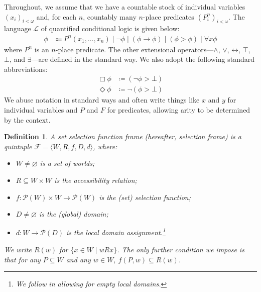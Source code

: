 \documentclass[12pt]{article}
\newtheorem{definition}{Definition}
\newcommand{\tup}[1]{\langle #1 \rangle}
\newcommand{\would}{\mathbin{>}}
\newcommand{\nec}{\mathop{\Box}}
\newcommand{\pos}{\mathop{\Diamond}}
\newcommand{\then}{\mathbin{\rightarrow}}
\renewcommand{\iff}{\mathbin{\leftrightarrow}}
\begin{document}
Throughout, we assume that we have a countable stock of individual variables $(x_i)_{i<\omega}$ and, for each $n$, countably many $n$-place predicates $(P_i^n)_{i<\omega}$. 
The language $\mathcal{L}$ of quantified conditional logic is given below:
    \begin{align*}
        \phi & \Coloneqq P^n (x_1,\dots,x_n) \mid \neg\phi \mid (\phi \then \phi) \mid (\phi \would \phi) \mid \forall x\phi
    \end{align*}
where $P^n$ is an $n$-place predicate. 
The other extensional operators---$\wedge$, $\vee$, $\iff$, $\top$, $\bot$, and $\exists$---are defined in the standard way. 
We also adopt the following standard abbreviations:
\begin{align*}
    \nec\phi & \coloneqq (\neg\phi \would \bot) \\
    \pos\phi & \coloneqq \neg(\phi \would \bot)
\end{align*}
We abuse notation in standard ways and often write things like $x$ and $y$ for individual variables and $P$ and $F$ for predicates, allowing arity to be determined by the context. 



\begin{definition}
\label{Definition:Set Selection Frame}
    A \emph{set selection function frame} (hereafter, \emph{selection frame}) is a quintuple $\mathcal{F} = \tup{W,R,f,D,d}$, where:
    \begin{itemize}
        \item $W \neq \varnothing$ is a set of worlds;
        \item $R \subseteq W \times W$ is the accessibility relation; 
        \item $f:\mathcal{P}(W)\times W \to \mathcal{P}(W)$ is the (set) selection function;
        \item $D \neq \varnothing$ is the (global) domain;
        \item $d\colon W \rightarrow \mathcal{P}(D)$ is the local domain assignment.\footnote{We follow \cite[p.~25]{StalnakerThomason1970} in allowing for empty local domains.}
    \end{itemize}
    We write $R(w)$ for $\{x \in W \mid wRx\}$. The only further condition we impose is that for any $P \subseteq W$ and any $w\in W$, $f(P,w) \subseteq R(w)$.
\end{definition}
\end{document}
